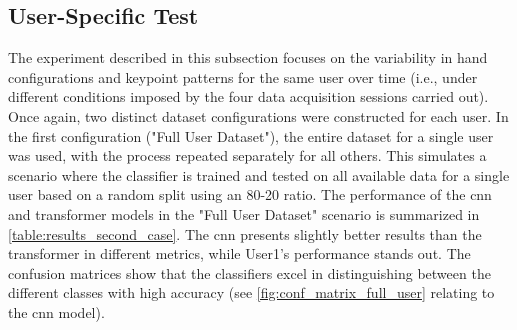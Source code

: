 
\subsection{User-Specific Test}

The experiment described in this subsection focuses on the variability in hand configurations and keypoint patterns for the same user over time (i.e., under different conditions imposed by the four data acquisition sessions carried out). Once again, two distinct dataset configurations were constructed for each user. In the first configuration ("Full User Dataset"), the entire dataset for a single user was used, with the process repeated separately for all others. This simulates a scenario where the classifier is trained and tested on all available data for a single user based on a random split using an 80-20 ratio. The performance of the \acs{cnn} and transformer models in the "Full User Dataset" scenario is summarized in \autoref{table:results_second_case}. The \acs{cnn} presents slightly better results than the transformer in different metrics, while User1's performance stands out. The confusion matrices show that the classifiers excel in distinguishing between the different classes with high accuracy (see \autoref{fig:conf_matrix_full_user} relating to the \acs{cnn} model). 


